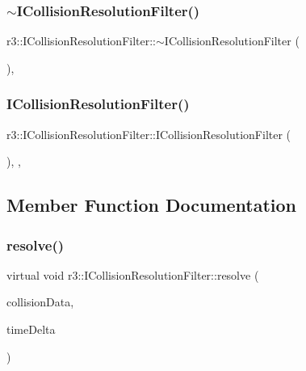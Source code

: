 \subsubsection{\texorpdfstring{$\sim$\+I\+Collision\+Resolution\+Filter()}{~ICollisionResolutionFilter()}}
{\footnotesize\ttfamily r3\+::\+I\+Collision\+Resolution\+Filter\+::$\sim$\+I\+Collision\+Resolution\+Filter (\begin{DoxyParamCaption}{ }\end{DoxyParamCaption})\hspace{0.3cm}{\ttfamily [virtual]}, {\ttfamily [default]}}

\mbox{\label{classr3_1_1_i_collision_resolution_filter_ab2dcf60620e28db288abf19bdeeb11ad}} 
\subsubsection{\texorpdfstring{I\+Collision\+Resolution\+Filter()}{ICollisionResolutionFilter()}}
{\footnotesize\ttfamily r3\+::\+I\+Collision\+Resolution\+Filter\+::\+I\+Collision\+Resolution\+Filter (\begin{DoxyParamCaption}{ }\end{DoxyParamCaption})\hspace{0.3cm}{\ttfamily [explicit]}, {\ttfamily [protected]}, {\ttfamily [default]}}



\subsection{Member Function Documentation}
\mbox{\label{classr3_1_1_i_collision_resolution_filter_a87ef2579e2acaaadef4cd8f9a20005ce}} 
\subsubsection{\texorpdfstring{resolve()}{resolve()}}
{\footnotesize\ttfamily virtual void r3\+::\+I\+Collision\+Resolution\+Filter\+::resolve (\begin{DoxyParamCaption}\item[{\mbox{\hyperlink{classr3_1_1_collision_data}{Collision\+Data}} \&}]{collision\+Data,  }\item[{\mbox{\hyperlink{namespacer3_ab2016b3e3f743fb735afce242f0dc1eb}{real}}}]{time\+Delta }\end{DoxyParamCaption})\hspace{0.3cm}{\ttfamily [pure virtual]}}




